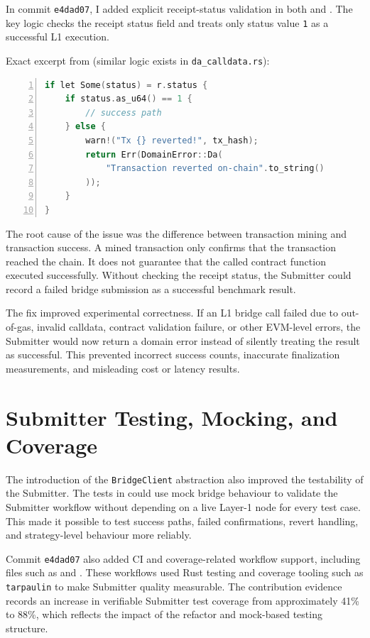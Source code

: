 In commit \texttt{e4dad07}, I added explicit receipt-status validation in both  and . The key logic checks the receipt status field and treats only status value \texttt{1} as a successful L1 execution.

Exact excerpt from  (similar logic exists in \texttt{da_calldata.rs}):

\begin{lstlisting}[language=C, numbers=left, breaklines=true, basicstyle=\ttfamily\small]
if let Some(status) = r.status {
    if status.as_u64() == 1 {
        // success path
    } else {
        warn!("Tx {} reverted!", tx_hash);
        return Err(DomainError::Da(
            "Transaction reverted on-chain".to_string()
        ));
    }
}
\end{lstlisting}

The root cause of the issue was the difference between transaction mining and transaction success. A mined transaction only confirms that the transaction reached the chain. It does not guarantee that the called contract function executed successfully. Without checking the receipt status, the Submitter could record a failed bridge submission as a successful benchmark result.

The fix improved experimental correctness. If an L1 bridge call failed due to out-of-gas, invalid calldata, contract validation failure, or other EVM-level errors, the Submitter would now return a domain error instead of silently treating the result as successful. This prevented incorrect success counts, inaccurate finalization measurements, and misleading cost or latency results.

\section{Submitter Testing, Mocking, and Coverage}

The introduction of the \texttt{BridgeClient} abstraction also improved the testability of the Submitter. The tests in  could use mock bridge behaviour to validate the Submitter workflow without depending on a live Layer-1 node for every test case. This made it possible to test success paths, failed confirmations, revert handling, and strategy-level behaviour more reliably.

Commit \texttt{e4dad07} also added CI and coverage-related workflow support, including files such as  and . These workflows used Rust testing and coverage tooling such as \texttt{tarpaulin} to make Submitter quality measurable. The contribution evidence records an increase in verifiable Submitter test coverage from approximately 41\% to 88\%, which reflects the impact of the refactor and mock-based testing structure.

